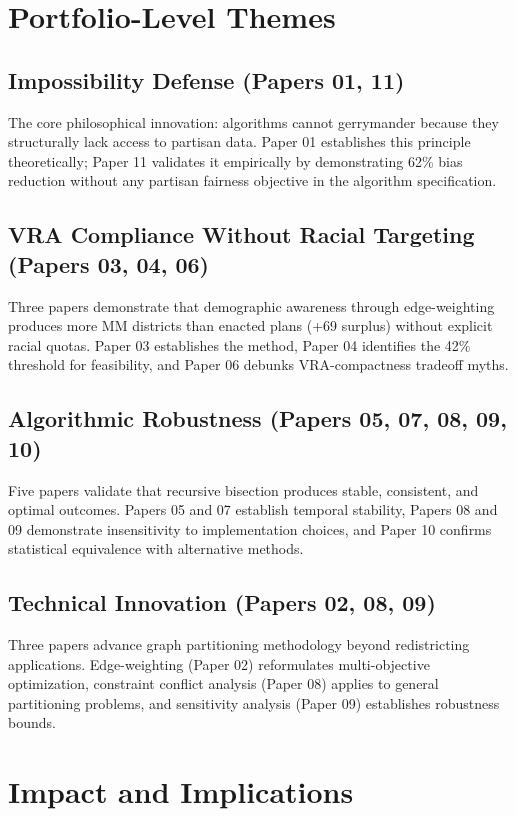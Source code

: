 \documentclass[11pt]{article}
\begin{document}
\section*{Portfolio-Level Themes}

\subsection*{Impossibility Defense (Papers 01, 11)}
The core philosophical innovation: algorithms cannot gerrymander because they structurally lack access to partisan data. Paper 01 establishes this principle theoretically; Paper 11 validates it empirically by demonstrating 62\% bias reduction without any partisan fairness objective in the algorithm specification.

\subsection*{VRA Compliance Without Racial Targeting (Papers 03, 04, 06)}
Three papers demonstrate that demographic awareness through edge-weighting produces more MM districts than enacted plans (+69 surplus) without explicit racial quotas. Paper 03 establishes the method, Paper 04 identifies the 42\% threshold for feasibility, and Paper 06 debunks VRA-compactness tradeoff myths.

\subsection*{Algorithmic Robustness (Papers 05, 07, 08, 09, 10)}
Five papers validate that recursive bisection produces stable, consistent, and optimal outcomes. Papers 05 and 07 establish temporal stability, Papers 08 and 09 demonstrate insensitivity to implementation choices, and Paper 10 confirms statistical equivalence with alternative methods.

\subsection*{Technical Innovation (Papers 02, 08, 09)}
Three papers advance graph partitioning methodology beyond redistricting applications. Edge-weighting (Paper 02) reformulates multi-objective optimization, constraint conflict analysis (Paper 08) applies to general partitioning problems, and sensitivity analysis (Paper 09) establishes robustness bounds.

\section*{Impact and Implications}
\end{document}
